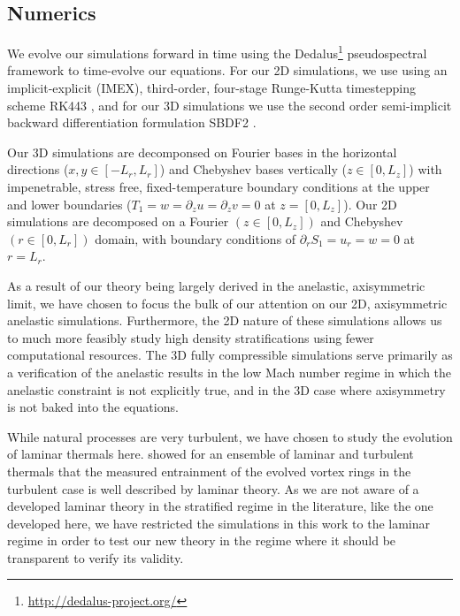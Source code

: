 \documentclass[twocolumn, amsmath, amsfonts, amssymb, trackchanges]{aastex62}
\begin{document}
\subsection{Numerics}
We evolve our simulations forward in time using the  Dedalus\footnote{\url{http://dedalus-project.org/}} pseudospectral framework \citep{burns&all2016} to time-evolve our equations. 
For our 2D simulations, we use using an implicit-explicit (IMEX), third-order, four-stage Runge-Kutta timestepping scheme RK443 \citep{ascher&all1997}, and for our 3D simulations we use the second order semi-implicit backward differentiation formulation SBDF2 \citep{wang&ruuth2008}.

Our 3D simulations are decomponsed on Fourier bases in the horizontal directions ($x, y \in [-L_r, L_r]$) and Chebyshev bases vertically ($z \in [0, L_z]$) with impenetrable, stress free, fixed-temperature boundary conditions at the upper and lower boundaries ($T_1 = w = \partial_z u = \partial_z v = 0$ at $z = [0, L_z]$).
Our 2D simulations are decomposed on a Fourier $(z \in [0, L_z])$ and Chebyshev $(r \in [0, L_r])$ domain, with boundary conditions of $\partial_r S_1 = u_r = w = 0$ at $r = L_r$.

As a result of our theory being largely derived in the anelastic, axisymmetric limit, we have chosen to focus the bulk of our attention on our 2D, axisymmetric anelastic simulations.
Furthermore, the 2D nature of these simulations allows us to much more feasibly study high density stratifications using fewer computational resources.
The 3D fully compressible simulations serve primarily as a verification of the anelastic results in the low Mach number regime in which the anelastic constraint is not explicitly true, and in the 3D case where axisymmetry is not baked into the equations.

While natural processes are very turbulent, we have chosen to study the evolution of laminar thermals here. 
\citet{lecoanet&jeevanjee2018} showed for an ensemble of laminar and turbulent thermals that the measured entrainment of the evolved vortex rings in the turbulent case is well described by laminar theory.
As we are not aware of a developed laminar theory in the stratified regime in the literature, like the one developed here, we have restricted the simulations in this work to the laminar regime in order to test our new theory in the regime where it should be transparent to verify its validity.


\end{document}

